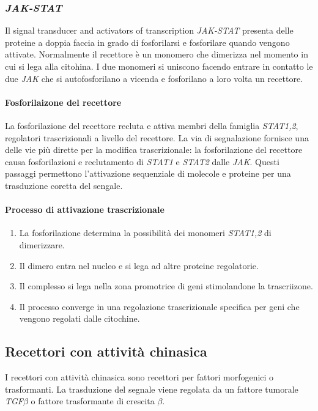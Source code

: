 		\subsubsection{\emph{JAK-STAT}}
		Il signal transducer and activators of transcription \emph{JAK-STAT} presenta delle proteine a doppia faccia in grado di fosforilarsi e fosforilare quando vengono attivate.
		Normalmente il recettore \`e un monomero che dimerizza nel momento in cui si lega alla citohina.
		I due monomeri si uniscono facendo entrare in contatto le due \emph{JAK} che si autofosforilano a vicenda e fosforilano a loro volta un recettore.

			\paragraph{Fosforilaizone del recettore}
			La fosforilazione del recettore recluta e attiva membri della famiglia \emph{STAT1,2}, regolatori trascrizionali a livello del recettore.
			La via di segnalazione fornisce una delle vie pi\`u dirette per la modifica trascrizionale: la fosforilazione del recettore causa fosforilazioni e reclutamento di \emph{STAT1} e \emph{STAT2} dalle \emph{JAK}.
			Questi passaggi permettono l'attivazione sequenziale di molecole e proteine per una trasduzione coretta del sengale.

			\paragraph{Processo di attivazione trascrizionale}
			\begin{multicols}{2}
				\begin{enumerate}
					\item La fosforilazione determina la possibilit\`a dei monomeri \emph{STAT1,2} di dimerizzare.
					\item Il dimero entra nel nucleo e si lega ad altre proteine regolatorie.
					\item Il complesso si lega nella zona promotrice di geni stimolandone la trascriizone.
					\item Il processo converge in una regolazione trascrizionale specifica per geni che vengono regolati dalle citochine.
				\end{enumerate}
			\end{multicols}
	
	\subsection{Recettori con attivit\`a chinasica}
	I recettori con attivit\`a chinasica sono recettori per fattori morfogenici o trasformanti.
	La trasduzione del segnale viene regolata da un fattore tumorale \emph{TGF$\beta$} o fattore trasformante di crescita $\beta$.

